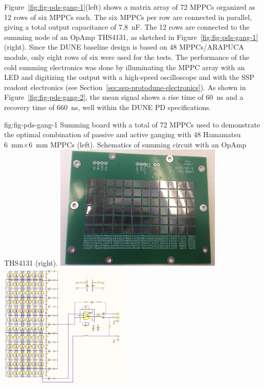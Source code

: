 Figure~\ref{fig:fig-pds-gang-1}(left) shows a matrix array of 72 MPPCs organized as 12 rows of six MPPCs each. 
The six MPPCs per row are connected in parallel, giving a total output capacitance of \SI{7.8}{nF}. The 12 rows are connected to the summing node of an OpAmp THS4131, as sketched in Figure~\ref{fig:fig-pds-gang-1}(right). 
Since the DUNE baseline design is based on 48 MPPCs/ARAPUCA module, only eight rows of six were used for the tests. 
The performance of the cold summing electronics was done by illuminating the MPPC array with an LED and digitizing the output with a high-speed oscilloscope and with the SSP readout electronics (see Section~\ref{sec:ssp-protodune-electronics}).
As shown in Figure~\ref{fig:fig-pds-gang-2}, the mean signal shows a rise time of \SI{60}{ns} and a recovery time of \SI{660}{ns}, well within the DUNE PD specifications. %

\begin{dunefigure}
 {fig:fig-pds-gang-1}
 {Summing board with a total of 72 MPPCs used to demonstrate the optimal combination of passive and active ganging with 48 Hamamatsu \SI{6}{mm}$\times$\SI{6}{mm} MPPCs (left).  Schematics of summing circuit with an OpAmp THS4131 (right).}
\includegraphics[height=6cm]{graphics/pds_gang_fig1.jpg}
\includegraphics[height=6cm]{graphics/pds_gang_fig2.png}
\end{dunefigure}

